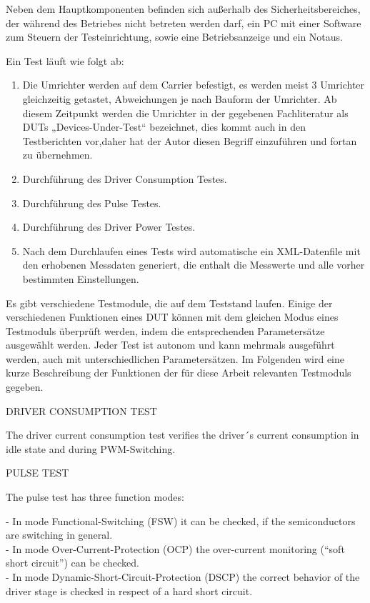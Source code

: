 Neben dem Hauptkomponenten befinden sich außerhalb des Sicherheitsbereiches, der während des Betriebes nicht betreten werden darf,
ein PC mit einer Software zum Steuern der Testeinrichtung, sowie eine Betriebsanzeige und ein Notaus.

\newpage

Ein Test läuft wie folgt ab:

\begin{enumerate}
\item Die Umrichter werden auf dem Carrier befestigt, es werden meist 3 Umrichter gleichzeitig getastet, Abweichungen je nach Bauform der Umrichter.
Ab diesem Zeitpunkt werden die Umrichter in der gegebenen Fachliteratur als DUTs „Devices-Under-Test“ bezeichnet, dies kommt auch in den Testberichten vor,daher hat der Autor diesen Begriff einzuführen und fortan zu übernehmen.


\item Durchführung des Driver Consumption Testes.


\item Durchführung des Pulse Testes.


\item Durchführung des Driver Power Testes.


\item Nach dem Durchlaufen eines Tests wird automatische ein XML-Datenfile mit den erhobenen Messdaten generiert, die enthalt die Messwerte und alle vorher bestimmten Einstellungen.


\end{enumerate}
Es gibt verschiedene Testmodule, die auf dem Teststand laufen. Einige der verschiedenen Funktionen eines DUT können mit dem gleichen Modus eines Testmoduls überprüft werden, indem die entsprechenden Parametersätze ausgewählt werden. Jeder Test ist autonom und kann mehrmals ausgeführt werden, auch mit unterschiedlichen Parametersätzen. Im Folgenden wird eine kurze Beschreibung der Funktionen der für diese Arbeit relevanten Testmoduls gegeben.

DRIVER CONSUMPTION TEST

The driver current consumption test verifies the driver´s current consumption in idle state and during PWM-Switching.

PULSE TEST

The pulse test has three function modes:

- In mode Functional-Switching (FSW) it can be checked, if the semiconductors are switching in general. \\
- In mode Over-Current-Protection (OCP) the over-current monitoring (“soft short circuit”) can be checked.\\
- In mode Dynamic-Short-Circuit-Protection (DSCP) the correct behavior of the driver stage is checked in respect of a hard short circuit.

